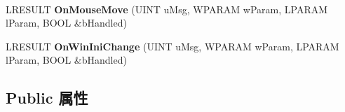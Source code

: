 \begin{DoxyCompactItemize}
$$\item 
\mbox{\label{class_c_internet_toolbar_a7675ddafad48f7159cbaab9489eece09}} 
L\+R\+E\+S\+U\+LT {\bfseries On\+Mouse\+Move} (U\+I\+NT u\+Msg, W\+P\+A\+R\+AM w\+Param, L\+P\+A\+R\+AM l\+Param, B\+O\+OL \&b\+Handled)
\item 
\mbox{\label{class_c_internet_toolbar_ab6569f983464a84dac6633d937245055}} 
L\+R\+E\+S\+U\+LT {\bfseries On\+Win\+Ini\+Change} (U\+I\+NT u\+Msg, W\+P\+A\+R\+AM w\+Param, L\+P\+A\+R\+AM l\+Param, B\+O\+OL \&b\+Handled)
\end{DoxyCompactItemize}
\subsection*{Public 属性}

